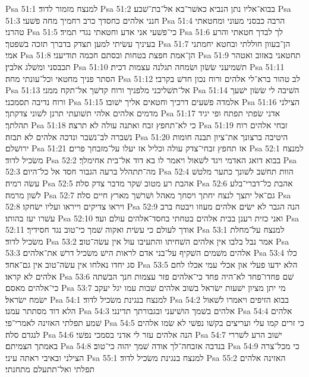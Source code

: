 Psa 51:1  למנצח מזמור לדוד׃
Psa 51:2  בבוא־אליו נתן הנביא כאשׁר־בא אל־בת־שׁבע׃
Psa 51:3  חנני אלהים כחסדך כרב רחמיך מחה פשׁעי׃
Psa 51:4  הרבה כבסני מעוני ומחטאתי טהרני׃
Psa 51:5  כי־פשׁעי אני אדע וחטאתי נגדי תמיד׃
Psa 51:6  לך לבדך חטאתי והרע בעיניך עשׂיתי למען תצדק בדברך תזכה בשׁפטך׃
Psa 51:7  הן־בעוון חוללתי ובחטא יחמתני אמי׃
Psa 51:8  הן־אמת חפצת בטחות ובסתם חכמה תודיעני׃
Psa 51:9  תחטאני באזוב ואטהר תכבסני ומשׁלג אלבין׃
Psa 51:10  תשׁמיעני שׂשׂון ושׂמחה תגלנה עצמות דכית׃
Psa 51:11  הסתר פניך מחטאי וכל־עונתי מחה׃
Psa 51:12  לב טהור ברא־לי אלהים ורוח נכון חדשׁ בקרבי׃
Psa 51:13  אל־תשׁליכני מלפניך ורוח קדשׁך אל־תקח ממני׃
Psa 51:14  השׁיבה לי שׂשׂון ישׁעך ורוח נדיבה תסמכני׃
Psa 51:15  אלמדה פשׁעים דרכיך וחטאים אליך ישׁובו׃
Psa 51:16  הצילני מדמים אלהים אלהי תשׁועתי תרנן לשׁוני צדקתך׃
Psa 51:17  אדני שׂפתי תפתח ופי יגיד תהלתך׃
Psa 51:18  כי לא־תחפץ זבח ואתנה עולה לא תרצה׃
Psa 51:19  זבחי אלהים רוח נשׁברה לב־נשׁבר ונדכה אלהים לא תבזה׃
Psa 51:20  היטיבה ברצונך את־ציון תבנה חומות ירושׁלם׃
Psa 51:21  אז תחפץ זבחי־צדק עולה וכליל אז יעלו על־מזבחך פרים׃
Psa 52:1  למנצח משׂכיל לדוד׃
Psa 52:2  בבוא דואג האדמי ויגד לשׁאול ויאמר לו בא דוד אל־בית אחימלך׃
Psa 52:3  מה־תתהלל ברעה הגבור חסד אל כל־היום׃
Psa 52:4  הוות תחשׁב לשׁונך כתער מלטשׁ עשׂה רמיה׃
Psa 52:5  אהבת רע מטוב שׁקר מדבר צדק סלה׃
Psa 52:6  אהבת כל־דברי־בלע לשׁון מרמה׃
Psa 52:7  גם־אל יתצך לנצח יחתך ויסחך מאהל ושׁרשׁך מארץ חיים סלה׃
Psa 52:8  ויראו צדיקים וייראו ועליו ישׂחקו׃
Psa 52:9  הנה הגבר לא ישׂים אלהים מעוזו ויבטח ברב עשׁרו יעז בהותו׃
Psa 52:10  ואני כזית רענן בבית אלהים בטחתי בחסד־אלהים עולם ועד׃
Psa 52:11  אודך לעולם כי עשׂית ואקוה שׁמך כי־טוב נגד חסידיך׃
Psa 53:1  למנצח על־מחלת משׂכיל לדוד׃
Psa 53:2  אמר נבל בלבו אין אלהים השׁחיתו והתעיבו עול אין עשׂה־טוב׃
Psa 53:3  אלהים משׁמים השׁקיף על־בני אדם לראות הישׁ משׂכיל דרשׁ את־אלהים׃
Psa 53:4  כלו סג יחדו נאלחו אין עשׂה־טוב אין גם־אחד׃
Psa 53:5  הלא ידעו פעלי און אכלי עמי אכלו לחם אלהים לא קראו׃
Psa 53:6  שׁם פחדו־פחד לא־היה פחד כי־אלהים פזר עצמות חנך הבשׁתה כי־אלהים מאסם׃
Psa 53:7  מי יתן מציון ישׁעות ישׂראל בשׁוב אלהים שׁבות עמו יגל יעקב ישׂמח ישׂראל׃
Psa 54:1  למנצח בנגינת משׂכיל לדוד׃
Psa 54:2  בבוא הזיפים ויאמרו לשׁאול הלא דוד מסתתר עמנו׃
Psa 54:3  אלהים בשׁמך הושׁיעני ובגבורתך תדינני׃
Psa 54:4  אלהים שׁמע תפלתי האזינה לאמרי־פי׃
Psa 54:5  כי זרים קמו עלי ועריצים בקשׁו נפשׁי לא שׂמו אלהים לנגדם סלה׃
Psa 54:6  הנה אלהים עזר לי אדני בסמכי נפשׁי׃
Psa 54:7  ישׁוב הרע לשׁררי באמתך הצמיתם׃
Psa 54:8  בנדבה אזבחה־לך אודה שׁמך יהוה כי־טוב׃
Psa 54:9  כי מכל־צרה הצילני ובאיבי ראתה עיני׃
Psa 55:1  למנצח בנגינת משׂכיל לדוד׃
Psa 55:2  האזינה אלהים תפלתי ואל־תתעלם מתחנתי׃
